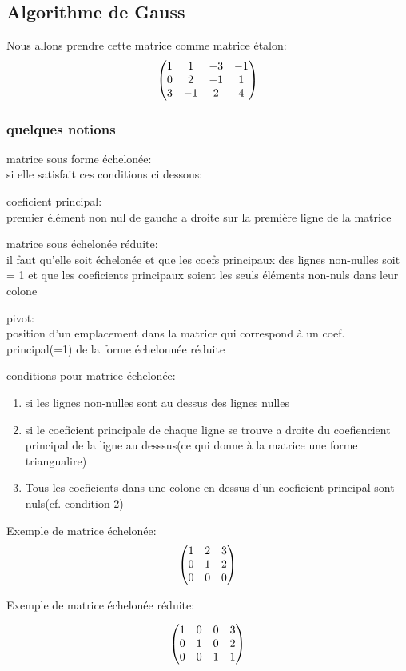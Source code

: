 \documentclass[a4paper,10pt]{article}
\begin{document}
\subsection{Algorithme de Gauss}
Nous allons prendre cette matrice comme matrice étalon:
\[
\begin{pmatrix}%
 1&1&-3&-1\cr
 0&2&-1&1\cr
 3&-1&2&4 
 \end{pmatrix}
\]
 \subsubsection{quelques notions}
\begin{description}
 \item matrice sous forme échelonée:\\{si elle satisfait ces conditions ci dessous:}
 \item coeficient principal:\\{premier élément non nul de gauche a droite sur la première ligne de la matrice}
 \item matrice sous échelonée réduite:\\{il faut qu'elle soit échelonée et que les coefs principaux des lignes non-nulles soit = 1 et que les coeficients principaux soient les seuls éléments non-nuls dans leur colone}
 \item pivot:\\{position d'un emplacement dans la matrice qui correspond à un coef. principal(=1) de la forme échelonnée réduite}
 \end{description}
conditions pour matrice échelonée:
\begin{enumerate}
 \item si les lignes non-nulles sont au dessus des lignes nulles
 \item si le coeficient principale de chaque ligne se trouve a droite du coefiencient principal de la ligne au desssus(ce qui donne à la matrice une forme triangualire)
 \item Tous les coeficients dans une colone en dessus d'un coeficient principal sont nuls(cf. condition 2)
\end{enumerate}
Exemple de matrice échelonée:
\[
\begin{pmatrix}%
 1&2&3\cr
 0&1&2\cr
 0&0&0
\end{pmatrix}
\]

Exemple de matrice échelonée réduite:

\[
\begin{pmatrix}%
 1&0&0&3\cr
 0&1&0&2\cr
 0&0&1&1
\end{pmatrix}
\]
\end{document}
